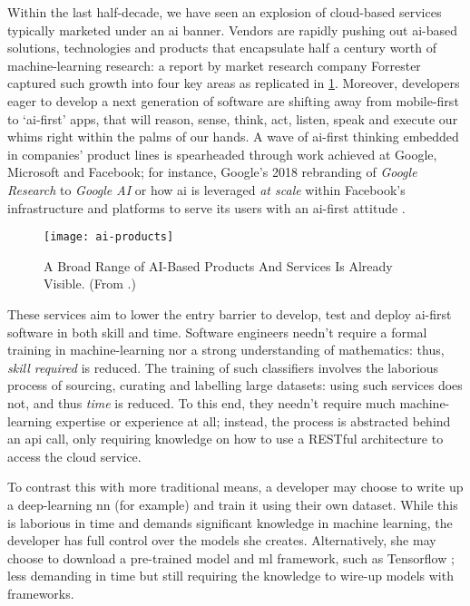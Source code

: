 \label{sec:introduction:preface}

Within the last half-decade, we have seen an explosion of cloud-based services typically marketed under an \gls{ai} banner. 
Vendors are rapidly pushing out \gls{ai}-based solutions, technologies and products that encapsulate half a century worth of machine-learning research: a \citeyear{LoGiudice:2016wf} report by market research company Forrester captured such growth into four key areas \citep{LoGiudice:2016wf} as replicated in  \cref{fig:introduction:ai-products}. 
Moreover, developers eager to develop a next generation of software are shifting away from mobile-first to `\gls{ai}-first' apps, that will reason, sense, think, act, listen, speak and execute our whims right within the palms of our hands. 
A wave of \gls{ai}-first thinking embedded in companies' product lines is spearheaded through work achieved at Google, Microsoft and Facebook; for instance, Google's 2018 rebranding of \textit{Google Research} to \textit{Google AI} \citep{Howard:2018tz} or how \gls{ai} is leveraged \textit{at scale} within Facebook's infrastructure and platforms to serve its users with an \gls{ai}-first attitude \citep{Parekh:2017hx}.

\begin{figure}[thp]
\centering
\caption[Categorisation of AI-based products and services]{A Broad Range of AI-Based Products And Services Is Already Visible. (From \citep{LoGiudice:2016wf}.)}
\label{fig:introduction:ai-products}
\texttt{[image: ai-products]}
\end{figure}

These services aim to lower the entry barrier to develop, test and deploy \gls{ai}-first software in both skill and time. 
Software engineers needn't require a formal training in machine-learning nor a strong understanding of mathematics: thus, \textit{skill required} is reduced. The training of such classifiers involves the laborious process of sourcing, curating and labelling large datasets: using such services does not, and thus \textit{time} is reduced. To this end, they needn't require much machine-learning expertise or experience at all; instead, the process is abstracted behind an \gls{api} call, only requiring knowledge on how to use a RESTful architecture \citep{Fielding:2000vh} to access the cloud service. 

To contrast this with more traditional means, a developer may choose to write up a deep-learning \gls{nn} (for example) and train it using their own dataset. While this is laborious in time and demands significant knowledge in machine learning, the developer has full control over the models she creates. Alternatively, she may choose to download a pre-trained model and \gls{ml} framework, such as Tensorflow \citep{Tensorflow:Whitepaper}; less demanding in time but still requiring the knowledge to wire-up models with frameworks.

